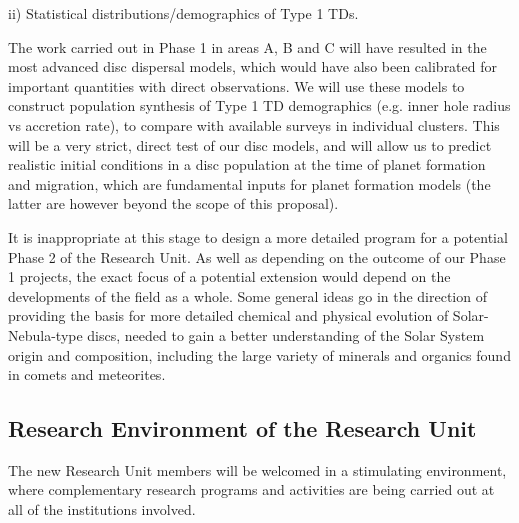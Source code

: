 \documentclass[10pt,fleqn,twoside]{article}
\begin{document}
\begin{Emphasize}
ii) Statistical distributions/demographics of Type 1 TDs. \\
\end{Emphasize}
The work carried out in Phase 1 in areas A, B and C will have resulted
in the most advanced disc dispersal models, which would have also been
calibrated for important quantities with direct observations. We will
use these models to construct population synthesis of Type 1
TD demographics (e.g. inner hole radius vs accretion
rate), to compare with available surveys in individual clusters.  
This will be a very strict, direct test of our disc models, and will
allow us to predict realistic initial conditions in a disc population at the
time of planet formation and migration, which are fundamental inputs
for planet formation models (the latter are however beyond the scope of this
proposal).  

It is inappropriate at this stage to design a more detailed program
for a potential Phase 2 of the Research Unit. As well as depending on
the outcome of our Phase 1 projects, the exact focus of a potential
extension would depend on the developments of the field as a
whole. Some general ideas go in the direction of providing the basis for more detailed chemical
and physical evolution of Solar-Nebula-type discs, needed to gain a
better understanding of the Solar System origin and composition,
including the large variety of minerals and organics found in comets
and meteorites. 
\vspace{0.8em}

\subsection{Research Environment of the Research Unit}

The new Research Unit members will be welcomed in a stimulating
environment, where complementary research programs and activities are
being carried out at all of the institutions involved. 
\vspace{1em}
\end{document}
